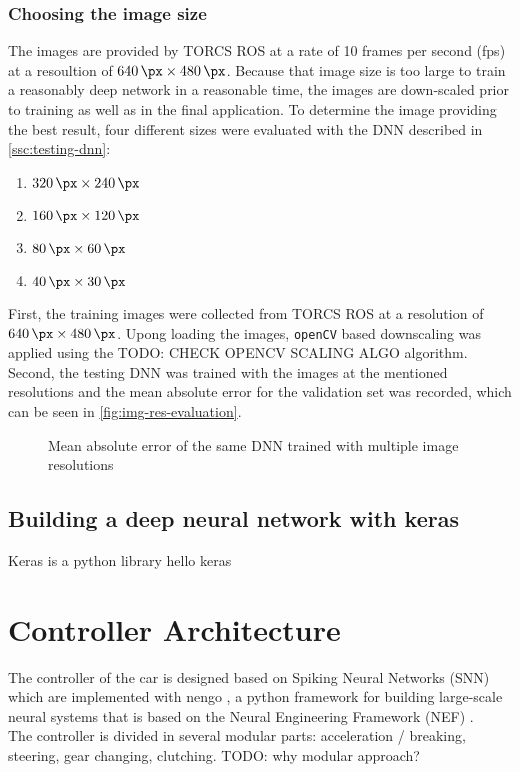 \documentclass[10pt,a4paper,twoside,journal]{IEEEtran}
\begin{document}
\subsubsection{Choosing the image size}
The images are provided by TORCS ROS \cite{mirus_torcs} at a rate of 10 frames per second (fps) at a resoultion of $ \SI{640}{\px} \times \SI{480}{\px} $. Because that image size is too large
to train a reasonably deep network in a reasonable time, the images are down-scaled prior to training as well as in the final application. To determine the image providing the best result, four different sizes were evaluated with the DNN described in \autoref{ssc:testing-dnn}: 
\begin{enumerate}
	\item $ \SI{320}{\px} \times \SI{240}{\px} $
	\item $ \SI{160}{\px} \times \SI{120}{\px} $
	\item $ \SI{80}{\px} \times \SI{60}{\px} $
	\item $ \SI{40}{\px} \times \SI{30}{\px} $
\end{enumerate}
First, the training images were collected from TORCS ROS at a resolution of $ \SI{640}{\px}\times \SI{480}{\px}$. Upong loading the images, \texttt{openCV} based downscaling was applied using the TODO: CHECK OPENCV SCALING ALGO algorithm. Second, the testing DNN was trained with the images at the mentioned resolutions and the mean absolute error 
for the validation set was recorded, which can be seen in \autoref{fig:img-res-evaluation}.
\begin{figure}
	\centering
	\caption{Mean absolute error of the same DNN trained with multiple image resolutions}
	\label{fig:img-res-evaluation}
\end{figure}

\subsection{Building a deep neural network with keras}
\label{ssc:keras}
Keras is a python library 
hello keras \cite{Toshev_2014_CVPR}

\section{Controller Architecture}
\label{sc:controller}

The controller of the car is designed based on Spiking Neural Networks (SNN) which are implemented with nengo \cite{nengo}, a python framework for building large-scale neural systems that is based on the Neural Engineering Framework (NEF) \cite{nef}. \\
The controller is divided in several modular parts: acceleration / breaking, steering, gear changing, clutching. TODO: why modular approach? \\
\end{document}
